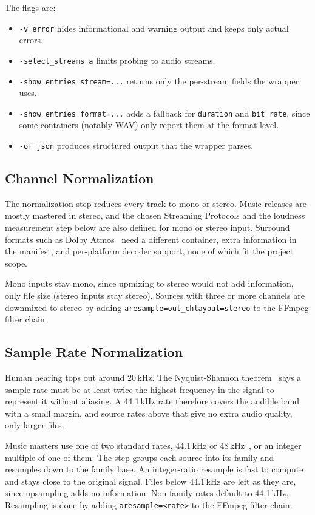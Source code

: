 The flags are:
\begin{itemize}
    \item \texttt{-v error} hides informational and warning output
    and keeps only actual errors.
    \item \texttt{-select\_streams a} limits probing to audio
    streams.
    \item \texttt{-show\_entries stream=...} returns only the
    per-stream fields the wrapper uses.
    \item \texttt{-show\_entries format=...} adds a fallback for
    \texttt{duration} and \texttt{bit\_rate}, since some containers
    (notably WAV) only report them at the format level.
    \item \texttt{-of json} produces structured output that the
    wrapper parses.
\end{itemize}

\subsection{Channel Normalization}
The normalization step reduces every track to mono or stereo. Music
releases are mostly mastered in stereo, and the chosen Streaming
Protocols and the loudness measurement step below are also defined
for mono or stereo input. Surround formats such as Dolby Atmos~\parencite{dolby_atmos} need
a different container, extra information in the manifest, and
per-platform decoder support, none of which fit the project scope.~\parencite{itu_bs775}

Mono inputs stay mono, since upmixing to stereo would not add
information, only file size (stereo inputs stay stereo). Sources with
three or more channels are downmixed to stereo by adding
\texttt{aresample=out\_chlayout=stereo} to the FFmpeg filter chain.

\subsection{Sample Rate Normalization}
Human hearing tops out around 20\,kHz. The Nyquist-Shannon theorem~\parencite{shannon_sampling}
says a sample rate must be at least twice the highest frequency in
the signal to represent it without aliasing. A 44.1\,kHz rate
therefore covers the audible band with a small margin, and source
rates above that give no extra audio quality, only larger files.~\parencite{lavry_sample_rate}

Music masters use one of two standard rates, 44.1\,kHz or 48\,kHz~\parencite{aes5},
or an integer multiple of one of them. The step groups each source
into its family and resamples down to the family base. An
integer-ratio resample is fast to compute and stays close to the
original signal. Files below 44.1\,kHz are left as they are, since
upsampling adds no information. Non-family rates default to
44.1\,kHz. Resampling is done by adding \texttt{aresample=<rate>}
to the FFmpeg filter chain.

